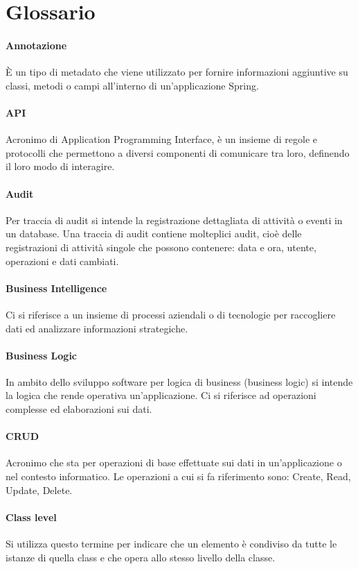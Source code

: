 \chapter{Glossario}
\label{cap:glossario}

\subsubsection*{Annotazione}
È un tipo di metadato che viene utilizzato per fornire informazioni aggiuntive su classi, metodi o campi all'interno di un'applicazione Spring. 
\subsubsection*{API}
Acronimo di Application Programming Interface, è un insieme di regole e protocolli che permettono a diversi componenti di comunicare tra loro, definendo il loro modo di interagire.
\subsubsection*{Audit}
Per traccia di audit si intende la registrazione dettagliata di attività o eventi in un database. Una traccia di audit contiene molteplici audit, cioè delle registrazioni di attività singole che possono contenere: data e ora, utente, operazioni e dati cambiati.
\subsubsection*{Business Intelligence}
Ci si riferisce a un insieme di processi aziendali o di tecnologie per raccogliere dati ed analizzare informazioni strategiche.
\subsubsection*{Business Logic}
In ambito dello sviluppo software per logica di business (business logic) si intende la logica che rende operativa un'applicazione. Ci si riferisce ad operazioni complesse ed elaborazioni sui dati.
\subsubsection*{CRUD}
Acronimo che sta per operazioni di base effettuate sui dati in un'applicazione o nel contesto informatico. Le operazioni a cui si fa riferimento sono: Create, Read, Update, Delete.
\subsubsection*{Class level}
Si utilizza questo termine per indicare che un elemento è condiviso da tutte le istanze di quella class e che opera allo stesso livello della classe.
